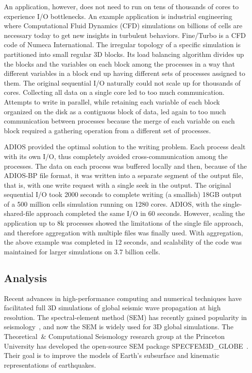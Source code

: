 An application, however, does not need to run on tens of thousands of cores to experience I/O bottlenecks. An example application is industrial engineering where Computational Fluid Dynamics (CFD) simulations on billions of cells are necessary today to get new insights in turbulent behaviors. Fine/Turbo is a CFD code of Numeca International. The irregular topology of a specific simulation is partitioned into small regular 3D blocks. Its load balancing algorithm divides up the blocks and the variables on each block among the processes in a way that different variables in a block end up having different sets of processes assigned to them. The original sequential  I/O naturally could not scale up for thousands of cores. Collecting all data on a single core led to too much communication.  Attempts to write in parallel, while retaining each variable of each block organized on the disk as a contiguous block of data, led again to too much communication between processes because the merge of each variable on each block required a gathering operation from a different set of processes. 

ADIOS provided the optimal solution to the writing problem. Each process dealt with its own I/O, thus completely avoided cross-communication among the processes. The data on each process was buffered locally and then, because of the ADIOS-BP file format, it was written into a separate segment of the output file, that is, with one write request with a single seek in the output. The original sequential I/O took 2000 seconds to complete writing (a smallish) 18GB output of a 500 million cells simulation running on 1280 cores. ADIOS, with the single-shared-file approach completed the same I/O in 60 seconds. However, scaling the application up to 8k processes showed the limitations of the single file approach, and therefore aggregation with multiple files was finally used. With aggregation, the above example was completed in 12 seconds, and scalability of the code was maintained for larger simulations on 3.7 billion cells.



%
%
\subsection{Analysis}

Recent advances in high-performance computing and numerical techniques have facilitated full 3D
simulations of global seismic wave propagation at high resolution. The spectral-element method (SEM)
has recently gained popularity in seismology~\cite{ADIOS:seismography:tromp2008spectral}, and now the SEM
is widely used for 3D global simulations. The Theoretical~\& Computational Seismology research group
at the Princeton University has developed the open-source SEM package
SPECFEM3D\_GLOBE~\cite{ADIOS:seismography:carrington2008high}. Their goal is to improve the models of
Earth's subsurface and kinematic representations of earthquakes.

